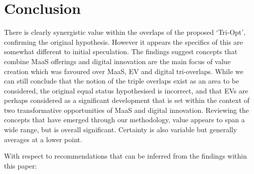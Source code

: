 \documentclass[journal]{IEEEtran}
\begin{document}


 



\section{Conclusion}\label{conclusion}

There is clearly synergistic value within the overlaps of the proposed
`Tri-Opt', confirming the original hypothesis. However it appears the
specifics of this are somewhat different to initial speculation. The
findings suggest concepts that combine MaaS offerings and digital
innovation are the main focus of value creation which was favoured over
MaaS, EV and digital tri-overlaps. While we can still conclude that
the notion of the triple overlaps exist as an area to be considered,
the original equal status hypothesised is incorrect, and that EVs are
perhaps considered as a significant development that is set within the
context of two transformative opportunities of MaaS and digital
innovation. Reviewing the concepts that have emerged through our
methodology, value appears to span a wide range, but is overall
significant. Certainty is also variable but generally averages at a
lower point.

With respect to recommendations that can be inferred from the findings
within this paper:
\end{document}
